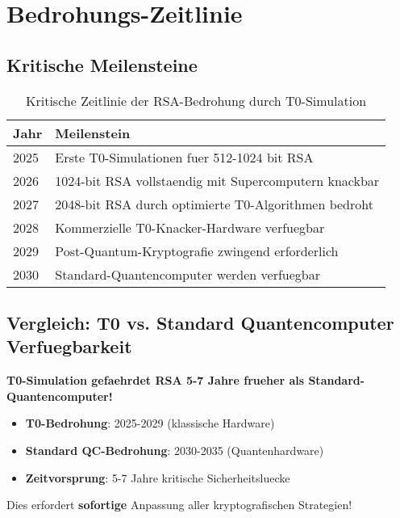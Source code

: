 \documentclass[12pt,a4paper]{article}
\begin{document}
	\section{Bedrohungs-Zeitlinie}
	
	\subsection{Kritische Meilensteine}
	
	\begin{table}[htbp]
		\centering
		\begin{tabular}{lp{10cm}}
			\toprule
			\textbf{Jahr} & \textbf{Meilenstein} \\
			\midrule
			\rowcolor{red!20} 2025 & Erste T0-Simulationen fuer 512-1024 bit RSA \\
			\rowcolor{red!30} 2026 & 1024-bit RSA vollstaendig mit Supercomputern knackbar \\
			\rowcolor{red!40} 2027 & 2048-bit RSA durch optimierte T0-Algorithmen bedroht \\
			\rowcolor{orange!30} 2028 & Kommerzielle T0-Knacker-Hardware verfuegbar \\
			\rowcolor{red!50} 2029 & Post-Quantum-Kryptografie zwingend erforderlich \\
			\rowcolor{green!20} 2030 & Standard-Quantencomputer werden verfuegbar \\
			\bottomrule
		\end{tabular}
		\caption{Kritische Zeitlinie der RSA-Bedrohung durch T0-Simulation}
		\label{tab:threat_timeline}
	\end{table}
	
	\subsection{Vergleich: T0 vs. Standard Quantencomputer Verfuegbarkeit}
	
	\begin{tcolorbox}[colback=red!5!white,colframe=red!75!black,title=Kritische Erkenntnis]
		\textbf{T0-Simulation gefaehrdet RSA 5-7 Jahre frueher als Standard-Quantencomputer!}
		
		\begin{itemize}
			\item \textbf{T0-Bedrohung}: 2025-2029 (klassische Hardware)
			\item \textbf{Standard QC-Bedrohung}: 2030-2035 (Quantenhardware)
			\item \textbf{Zeitvorsprung}: 5-7 Jahre kritische Sicherheitsluecke
		\end{itemize}
		
		Dies erfordert \textbf{sofortige} Anpassung aller kryptografischen Strategien!
	\end{tcolorbox}
	
\end{document}

